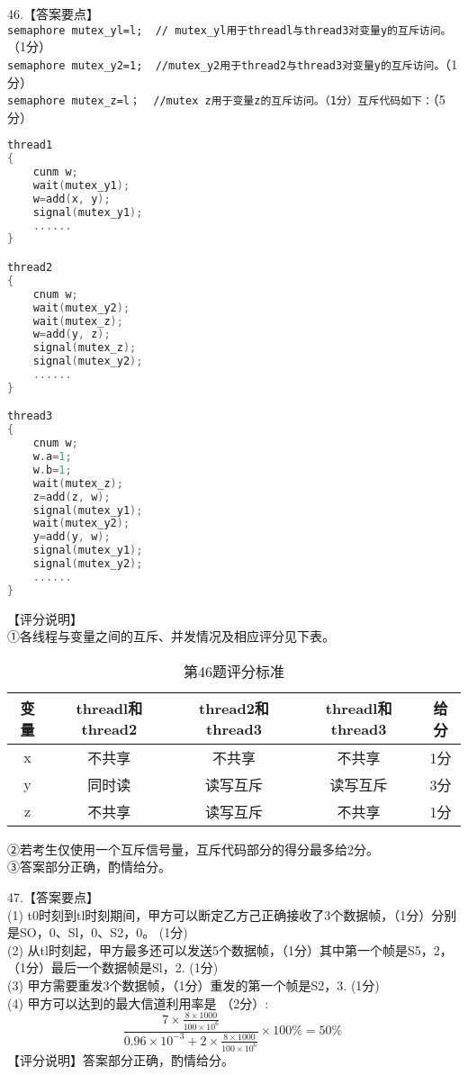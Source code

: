46.【答案要点】 \\
\verb|semaphore mutex_yl=l;  // mutex_yl用于threadl与thread3对变量y的互斥访问。|（1分） \\
\verb|semaphore mutex_y2=1;  //mutex_y2用于thread2与thread3对变量y的互斥访问。|（1分） \\
\verb|semaphore mutex_z=l；  //mutex z用于变量z的互斥访问。（1分）互斥代码如下：|（5分） \\
\begin{lstlisting}[language=cpp]
thread1
{
    cunm w;
    wait(mutex_y1);
    w=add(x, y);
    signal(mutex_y1);
    ......
}

thread2
{
    cnum w;
    wait(mutex_y2);
    wait(mutex_z);
    w=add(y, z);
    signal(mutex_z);
    signal(mutex_y2);
    ......
}

thread3
{
    cnum w;
    w.a=1;
    w.b=1;
    wait(mutex_z);
    z=add(z, w);
    signal(mutex_y1);
    wait(mutex_y2);
    y=add(y, w);
    signal(mutex_y1);
    signal(mutex_y2);
    ......
}
\end{lstlisting}
【评分说明】 \\
①各线程与变量之间的互斥、并发情况及相应评分见下表。
\begin{table}[ht]
\centering
\caption{第46题评分标准}\label{tab_CSN17_4}
\begin{tabular}{|c|c|c|c|c|}
\hline
变量 & threadl和thread2 & thread2和thread3 & threadl和thread3 & 给分 \\
\hline
x & 不共享 & 不共享 & 不共享 & 1分 \\
\hline
y & 同时读 & 读写互斥 & 读写互斥 & 3分 \\
\hline
z & 不共享 & 读写互斥 & 不共享 & 1分 \\
\hline
\end{tabular}
\end{table}
②若考生仅使用一个互斥信号量，互斥代码部分的得分最多给2分。 \\
③答案部分正确，酌情给分。

47.【答案要点】 \\
(1) t0时刻到tl时刻期间，甲方可以断定乙方己正确接收了3个数据帧，（1分）分别是SO，0、Sl，0、S2，0。 (1分) \\
(2) 从tl时刻起，甲方最多还可以发送5个数据帧，（1分）其中第一个帧是S5，2，（1分）最后一个数据帧是Sl，2. (1分) \\
(3) 甲方需要重发3个数据帧，（1分）重发的第一个帧是S2，3. (1分) \\
(4) 甲方可以达到的最大信道利用率是 （2分）: \\
\begin{equation}
\frac{7 \times \frac{8\times1000}{100\times10^6}}{0.96\times10^{-3}+2\times\frac{8\times1000}{100\times10^6}}\times100\%=50\%~
\end{equation}
【评分说明】答案部分正确，酌情给分。